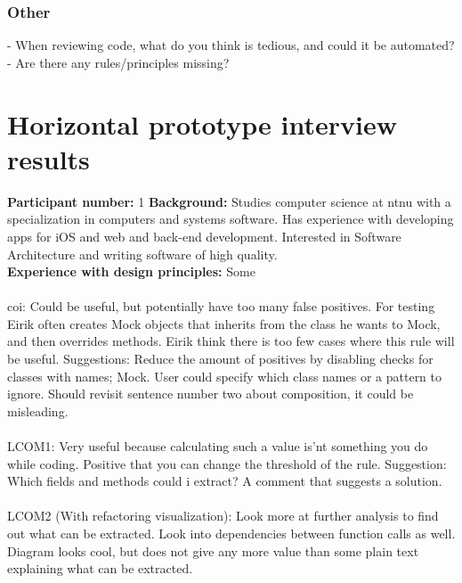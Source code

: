 \subsubsection*{Other} 
- When reviewing code, what do you think is tedious, and could it be automated?
- Are there any rules/principles missing?

\clearpage
\section{Horizontal prototype interview results}
\label{horizontal-prototype-interview-results}

\textbf{Participant number:} 1 \newline
\textbf{Background:} Studies computer science at \gls{ntnu} with a specialization in computers and systems software. Has experience with developing apps for iOS and web and back-end development. Interested in Software Architecture and writing software of high quality. \\
\textbf{Experience with design principles:} Some \\\\

\noindent \gls{coi}: Could be useful, but potentially have too many false positives. For testing Eirik often creates Mock objects that inherits from the class he wants to Mock, and then overrides methods. Eirik think there is too few cases where this rule will be useful. Suggestions: Reduce the amount of positives by disabling checks for classes with names; Mock. User could specify which class names or a pattern to ignore. Should revisit sentence number two about composition, it could be misleading.\\\\

\noindent LCOM1: Very useful because calculating such a value is'nt something you do while coding. Positive that you can change the threshold of the rule. Suggestion: Which fields and methods could i extract? A comment that suggests a solution. \\\\

\noindent LCOM2 (With refactoring visualization): Look more at further analysis to find out what can be extracted. Look into dependencies between function calls as well. Diagram looks cool, but does not give any more value than some plain text explaining what can be extracted. \\\\

